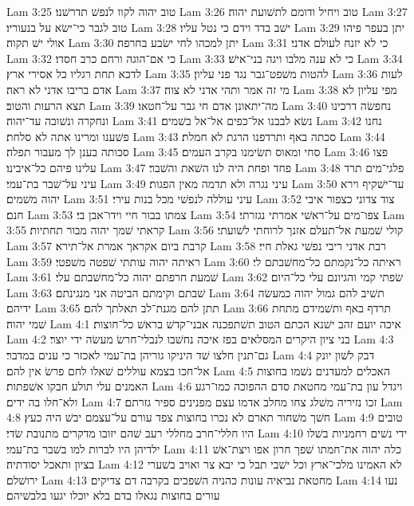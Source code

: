Lam 3:25  טוב יהוה לקוו לנפשׁ תדרשׁנו׃
Lam 3:26  טוב ויחיל ודומם לתשׁועת יהוה׃
Lam 3:27  טוב לגבר כי־ישׂא על בנעוריו׃
Lam 3:28  ישׁב בדד וידם כי נטל עליו׃
Lam 3:29  יתן בעפר פיהו אולי ישׁ תקוה׃
Lam 3:30  יתן למכהו לחי ישׂבע בחרפה׃
Lam 3:31  כי לא יזנח לעולם אדני׃
Lam 3:32  כי אם־הוגה ורחם כרב חסדו׃
Lam 3:33  כי לא ענה מלבו ויגה בני־אישׁ׃
Lam 3:34  לדכא תחת רגליו כל אסירי ארץ׃
Lam 3:35  להטות משׁפט־גבר נגד פני עליון׃
Lam 3:36  לעות אדם בריבו אדני לא ראה׃
Lam 3:37  מי זה אמר ותהי אדני לא צוה׃
Lam 3:38  מפי עליון לא תצא הרעות והטוב׃
Lam 3:39  מה־יתאונן אדם חי גבר על־חטאו׃
Lam 3:40  נחפשׂה דרכינו ונחקרה ונשׁובה עד־יהוה׃
Lam 3:41  נשׂא לבבנו אל־כפים אל־אל בשׁמים׃
Lam 3:42  נחנו פשׁענו ומרינו אתה לא סלחת׃
Lam 3:43  סכתה באף ותרדפנו הרגת לא חמלת׃
Lam 3:44  סכותה בענן לך מעבור תפלה׃
Lam 3:45  סחי ומאוס תשׂימנו בקרב העמים׃
Lam 3:46  פצו עלינו פיהם כל־איבינו׃
Lam 3:47  פחד ופחת היה לנו השׁאת והשׁבר׃
Lam 3:48  פלגי־מים תרד עיני על־שׁבר בת־עמי׃
Lam 3:49  עיני נגרה ולא תדמה מאין הפגות׃
Lam 3:50  עד־ישׁקיף וירא יהוה משׁמים׃
Lam 3:51  עיני עוללה לנפשׁי מכל בנות עירי׃
Lam 3:52  צוד צדוני כצפור איבי חנם׃
Lam 3:53  צמתו בבור חיי וידו־אבן בי׃
Lam 3:54  צפו־מים על־ראשׁי אמרתי נגזרתי׃
Lam 3:55  קראתי שׁמך יהוה מבור תחתיות׃
Lam 3:56  קולי שׁמעת אל־תעלם אזנך לרוחתי לשׁועתי׃
Lam 3:57  קרבת ביום אקראך אמרת אל־תירא׃
Lam 3:58  רבת אדני ריבי נפשׁי גאלת חיי׃
Lam 3:59  ראיתה יהוה עותתי שׁפטה משׁפטי׃
Lam 3:60  ראיתה כל־נקמתם כל־מחשׁבתם לי׃
Lam 3:61  שׁמעת חרפתם יהוה כל־מחשׁבתם עלי׃
Lam 3:62  שׂפתי קמי והגיונם עלי כל־היום׃
Lam 3:63  שׁבתם וקימתם הביטה אני מנגינתם׃
Lam 3:64  תשׁיב להם גמול יהוה כמעשׂה ידיהם׃
Lam 3:65  תתן להם מגנת־לב תאלתך להם׃
Lam 3:66  תרדף באף ותשׁמידם מתחת שׁמי יהוה׃
Lam 4:1  איכה יועם זהב ישׁנא הכתם הטוב תשׁתפכנה אבני־קדשׁ בראשׁ כל־חוצות׃
Lam 4:2  בני ציון היקרים המסלאים בפז איכה נחשׁבו לנבלי־חרשׂ מעשׂה ידי יוצר׃
Lam 4:3  גם־תנין חלצו שׁד היניקו גוריהן בת־עמי לאכזר כי ענים במדבר׃
Lam 4:4  דבק לשׁון יונק אל־חכו בצמא עוללים שׁאלו לחם פרשׂ אין להם׃
Lam 4:5  האכלים למעדנים נשׁמו בחוצות האמנים עלי תולע חבקו אשׁפתות׃
Lam 4:6  ויגדל עון בת־עמי מחטאת סדם ההפוכה כמו־רגע ולא־חלו בה ידים׃
Lam 4:7  זכו נזיריה משׁלג צחו מחלב אדמו עצם מפנינים ספיר גזרתם׃
Lam 4:8  חשׁך משׁחור תארם לא נכרו בחוצות צפד עורם על־עצמם יבשׁ היה כעץ׃
Lam 4:9  טובים היו חללי־חרב מחללי רעב שׁהם יזובו מדקרים מתנובת שׂדי׃
Lam 4:10  ידי נשׁים רחמניות בשׁלו ילדיהן היו לברות למו בשׁבר בת־עמי׃
Lam 4:11  כלה יהוה את־חמתו שׁפך חרון אפו ויצת־אשׁ בציון ותאכל יסודתיה׃
Lam 4:12  לא האמינו מלכי־ארץ וכל ישׁבי תבל כי יבא צר ואויב בשׁערי ירושׁלם׃
Lam 4:13  מחטאת נביאיה עונות כהניה השׁפכים בקרבה דם צדיקים׃
Lam 4:14  נעו עורים בחוצות נגאלו בדם בלא יוכלו יגעו בלבשׁיהם׃
